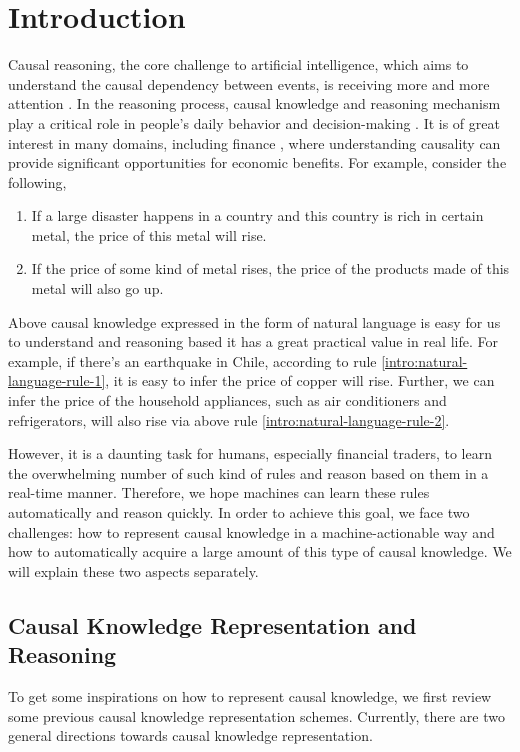 \section{Introduction}
\label{sec:intro}
Causal reasoning, the core challenge to artificial intelligence, which aims to understand the causal dependency between events, is receiving more and more attention \cite{Pearl2009}.
In the reasoning process, causal knowledge and reasoning mechanism play a critical role in people's daily behavior and decision-making \cite{waldmann2013causal}.
It is of great interest in many domains, including finance \cite{Dunietz2017}, where understanding causality can provide significant opportunities for economic benefits. 
For example, consider the following,
\begin{enumerate}
	\item If a large disaster happens in a country and this country is rich in certain metal, the price of this metal will rise. \label{intro:natural-language-rule-1}
	\item If the price of some kind of metal rises, the price of the products made of this metal will also go up. \label{intro:natural-language-rule-2}
\end{enumerate}
Above causal knowledge expressed in the form of natural language is easy for us to understand and reasoning based it has a great practical value in real life. 
For example, if there's an earthquake in Chile, according to rule \ref{intro:natural-language-rule-1}, it is easy to infer the price of copper will rise. Further, we can infer the price of the household appliances, such as air conditioners and refrigerators, will also rise via above rule \ref{intro:natural-language-rule-2}.

However, it is a daunting task for humans, especially financial traders, to learn the overwhelming number of such kind of rules and reason based on them in a real-time manner. Therefore, we hope machines can learn these rules automatically and reason quickly. 
In order to achieve this goal, we face two challenges: how to represent causal knowledge in a machine-actionable way and how to automatically acquire a large amount of this type of causal knowledge. We will explain these two aspects separately.
	
\subsection{Causal Knowledge Representation and Reasoning}
To get some inspirations on how to represent causal knowledge, we first review some previous causal knowledge representation schemes. Currently, there are two general directions towards causal knowledge representation. 

